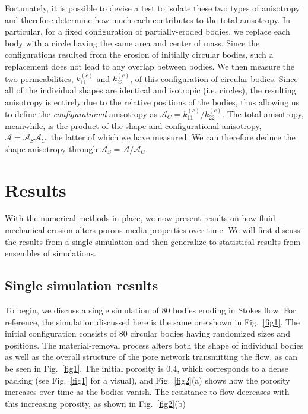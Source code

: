 \documentclass[3p]{elsarticle}
\newcommand{\anis}{\mathcal{A}}
\begin{document}
	Fortunately, it is possible to devise a test to isolate these two types of anisotropy and therefore determine how much each contributes to the total anisotropy. In particular, for a fixed configuration of partially-eroded bodies, we replace each body with a circle having the same area and center of mass. Since the configurations resulted from the erosion of initially circular bodies, such a replacement does not lead to any overlap between bodies. We then measure the two permeabilities, $k_{11}^{(c)}$ and $ k_{22}^{(c)}$, of this configuration of circular bodies. Since all of the individual shapes are identical and isotropic (i.e. circles), the resulting anisotropy is entirely due to the relative positions of the bodies, thus allowing us to define the {\em configurational} anisotropy as $\anis_C = k_{11}^{(c)} / k_{22}^{(c)}$. The total anisotropy, meanwhile, is the product of the shape and configurational anisotropy, $\anis = \anis_S \anis_C$, the latter of which we have measured. We can therefore deduce the shape anisotropy through $\anis_S = \anis/\anis_C$.

\section{Results}
\label{sec:results}

With the numerical methods in place, we now present results on how fluid-mechanical erosion alters porous-media properties over time. We will first discuss the results from a single simulation and then generalize to statistical results from ensembles of simulations.

\subsection{Single simulation results}

To begin, we discuss a single simulation of 80 bodies eroding in Stokes flow. For reference, the simulation discussed here is the same one shown in Fig.~\ref{fig1}. The initial configuration consists of 80 circular bodies having randomized sizes and positions. The material-removal process alters both the shape of individual bodies as well as the overall structure of the pore network transmitting the flow, as can be seen in Fig.~\ref{fig1}. The initial porosity is $0.4$, which corresponds to a dense packing (see Fig.~\ref{fig1} for a visual), and Fig.~\ref{fig2}(a) shows how the porosity increases over time as the bodies vanish. 
The resistance to flow decreases with this increasing porosity, as shown in Fig.~\ref{fig2}(b)
\end{document}
